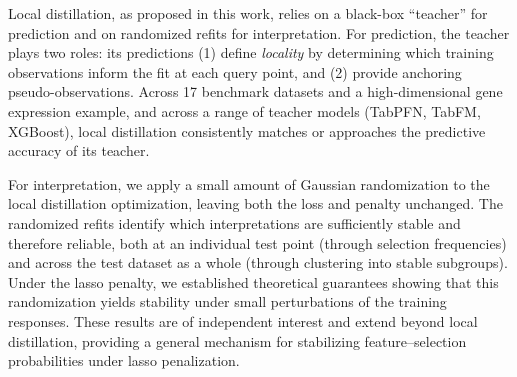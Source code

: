\documentclass[12pt]{article}
\theoremstyle{definition}
\begin{document}
Local distillation, as proposed in this work, relies on a black-box ``teacher'' for prediction and on randomized refits for interpretation. 
For prediction, the teacher plays two roles: its predictions (1) define \emph{locality} by determining which training observations inform the fit at each query point, and (2) provide anchoring pseudo-observations. 
Across 17 benchmark datasets and a high-dimensional gene expression example, and across a range of teacher models (TabPFN, TabFM, XGBoost), local distillation consistently matches or approaches the predictive accuracy of its teacher. 

For interpretation, we apply a small amount of Gaussian randomization to the local distillation optimization, leaving both the loss and penalty unchanged. 
The randomized refits identify which interpretations are sufficiently stable and therefore reliable, both at an individual test point (through selection frequencies) and across the test dataset as a whole (through clustering into stable subgroups). 
Under the lasso penalty, we established theoretical guarantees showing that this randomization yields stability under small perturbations of the training responses. These results are of independent interest and extend beyond local distillation, providing a general mechanism for stabilizing feature--selection probabilities under lasso penalization.


\end{document}
